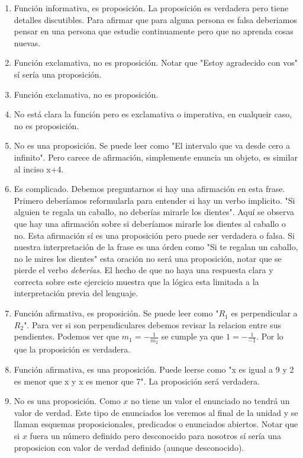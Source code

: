\documentclass[a4paper]{article}
\begin{document}
\begin{enumerate}
\begin{enumerate} [label=(\alph*)]
		\item Función informativa, es proposición. La proposición es verdadera pero tiene detalles discutibles. Para afirmar que para alguna persona es falsa deberiamos pensar en una persona que estudie continuamente pero que no aprenda cosas nuevas.
		\item Función exclamativa, no es proposición. Notar que "Estoy agradecido con vos" sí sería una proposición.
		\item Función exclamativa, no es proposición.
		\item No está clara la función pero es exclamativa o imperativa, en cualqueir caso, no es proposición.
		\item No es una proposición. Se puede leer como "El intervalo que va desde cero a infinito". Pero carece de afirmación, simplemente enuncia un objeto, es similar al inciso x+4.
		\item Es complicado. Debemos preguntarnos si hay una afirmación en esta frase. Primero deberíamos reformularla para entender si hay un verbo implicito. "Si alguien te regala un caballo, no deberías mirarle los dientes". Aquí se observa que hay una afirmación sobre si deberíamos mirarle los dientes al caballo o no. Esta afirmación sí es una proposición pero puede ser verdadera o falsa. Si nuestra interpretación de la frase es una órden como "Si te regalan un caballo, no le mires los dientes" esta oración no será una proposición, notar que se pierde el verbo \textit{deberías}. El hecho de que no haya una respuesta clara y correcta sobre este ejercicio muestra que la lógica esta limitada a la interpretación previa del lenguaje. 
		\item Función afirmativa, es proposición. Se puede leer como "$R_1$ es perpendicular a $R_2$". Para ver si son perpendiculares debemos revisar la relacion entre sus pendientes. Podemos ver que $m_1 = -\frac{1}{m_2}$ se cumple ya que $1 = -\frac{1}{-1}$. Por lo que la proposición es verdadera.
		\item Función afirmativa, es una proposición. Puede leerse como "x es igual a 9 y 2 es menor que x y x es menor que 7". La proposición será verdadera.
		\item No es una proposición. Como $x$ no tiene un valor el enunciado no tendrá un valor de verdad. Este tipo de enunciados los veremos al final de la unidad y se llaman esquemas proposicionales, predicados o enunciados abiertos. Notar que si $x$ fuera un número definido pero desconocido para nosotros sí sería una proposicion con valor de verdad definido (aunque desconocido).

\end{enumerate}
\end{enumerate}
\end{document}
